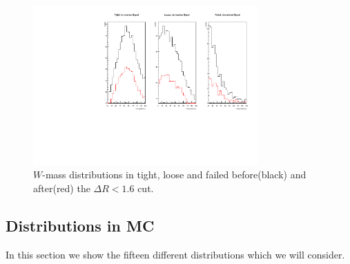 \begin{}[h!]
\begin{figure}[h!]
        \includegraphics[width=0.77\textwidth]{figs/WtagSF/sigproofII.pdf}
    \caption{$W$-mass distributions in tight, loose and failed before(black) and after(red) the $\Delta R < 1.6$ cut.}\label{fig:drproof}
\end{figure}
\subsection{Distributions in MC}
In this section we show the fifteen different distributions which we will consider.

\end{}
